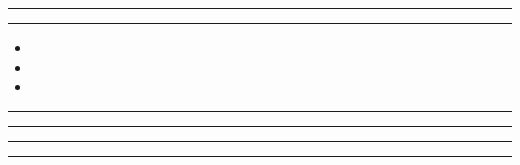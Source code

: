 \documentclass[11pt,a4paper]{article}
\begin{document}
\swarmwrapnext\lipsum[1]\lipsum[2]\lipsum[3]\lipsum[4]\lipsum[5]
\begin{swarmwrap}%
  \begin{minipage}[t]{5cm}
    \centering
    \textcolor{red!20}{\rule{\linewidth}{4cm}}
  \end{minipage}%
\end{swarmwrap}%
\swarmwrapnext\lipsum[1]\lipsum[2]\lipsum[3]\lipsum[4]\lipsum[5]\lipsum[6]
\begin{swarmwrap}%
  \begin{minipage}[t]{2cm}
    \centering
    \textcolor{green!30}{\rule{\linewidth}{5cm}}
  \end{minipage}%
\end{swarmwrap}%
\swarmwrapnext
\begin{itemize}
  \item \lipsum[1][1-3]
  \item \lipsum[2][1-3]
  \item \lipsum[3][1-3]
\end{itemize}
\begin{swarmwrap}%
  \begin{minipage}[t]{3cm}
    \centering
    \textcolor{red!20}{\rule{\linewidth}{6cm}}
  \end{minipage}%
\end{swarmwrap}%
\swarmwrapnext\lipsum[1]\lipsum[2]
\begin{swarmwrap}%
  \begin{minipage}[t]{4cm}
    \centering
    \textcolor{red!20}{\rule{\linewidth}{7cm}}
  \end{minipage}%
\end{swarmwrap}%
\swarmwrapnext\lipsum[1]\lipsum[2]\lipsum[3]
\begin{swarmwrap}%
  \begin{minipage}[t]{5cm}
    \centering
    \textcolor{red!20}{\rule{\linewidth}{8cm}}
  \end{minipage}%
\end{swarmwrap}%
\swarmwrapnext\lipsum[1]\lipsum[2]\lipsum[3]\lipsum[4]
\begin{swarmwrap}%
  \begin{minipage}[t]{2cm}
    \centering
    \textcolor{red!20}{\rule{\linewidth}{9cm}}
  \end{minipage}%
\end{swarmwrap}%
\end{document}
